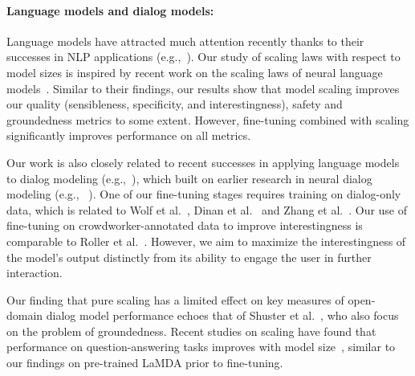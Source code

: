 \documentclass{article}
\begin{document}
\paragraph{Language models and dialog models:} Language models have attracted much attention recently thanks to their successes in NLP applications (e.g.,~\cite{mikolov2010recurrent,sutskever2011generating,JozefowiczVSSW16,dai2015semi,kiros2015skip,howard-ruder-2018-universal,radford2015unsupervised,radford2018improving,gpt320,rae2021scaling}). Our study of scaling laws with respect to model sizes is inspired by recent work on the scaling laws of neural language models~\cite{gpt320,Kaplan2020ScalingLF}. Similar to their findings, our results show that model scaling improves our quality (sensibleness, specificity, and interestingness), safety and groundedness metrics to some extent. However, fine-tuning combined with scaling significantly improves performance on all metrics. 

Our work is also closely related to recent successes in applying language models to dialog modeling (e.g.,~\cite{dinan2020,zhang2018,adiwardana2020humanlike,blenderbot}), which built on earlier research in neural dialog modeling (e.g., ~\cite{shang-etal-2015-neural,sordoni2015neural,NCM,li2015diversity,serban2016}). One of our fine-tuning stages requires training on dialog-only data, which is related to Wolf et al.~\cite{wolf}, Dinan et al.~\cite{dinan2020} and Zhang et al.~\cite{zhang2019dialogpt}. Our use of fine-tuning on crowdworker-annotated data to improve interestingness is comparable to Roller et al.~\cite{blenderbot}. However, we aim to maximize the interestingness of the model’s output distinctly from its ability to engage the user in further interaction. 

Our finding that pure scaling has a limited effect on key measures of open-domain dialog model performance echoes that of Shuster et al.~\cite{shuster2021retrieval}, who also focus on the problem of groundedness. Recent studies on scaling have found that performance on question-answering tasks improves with model size~\cite{roberts2020knowledge,du2021glam}, similar to our findings on pre-trained LaMDA prior to fine-tuning.
\end{document}
